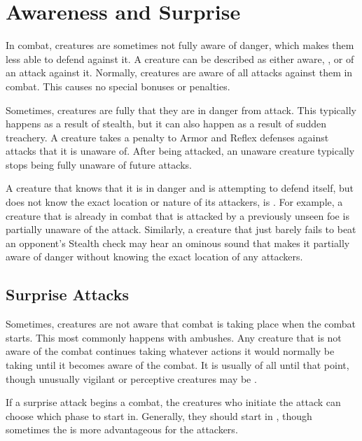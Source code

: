 \section{Awareness and Surprise}\label{Awareness and Surprise}
  In combat, creatures are sometimes not fully aware of danger, which makes them less able to defend against it.
  A creature can be described as either aware, \unaware, or \partiallyunaware of an attack against it.
  Normally, creatures are aware of all attacks against them in combat.
  This causes no special bonuses or penalties.

  Sometimes, creatures are fully \unaware that they are in danger from attack.
  This typically happens as a result of stealth, but it can also happen as a result of sudden treachery.
  A creature takes a  penalty to Armor and Reflex defenses against attacks that it is unaware of.
  After being attacked, an unaware creature typically stops being fully unaware of future attacks.

  A creature that knows that it is in danger and is attempting to defend itself, but does not know the exact location or nature of its attackers, is \partiallyunaware.
  For example, a creature that is already in combat that is attacked by a previously unseen foe is partially unaware of the attack.
  Similarly, a creature that just barely fails to beat an opponent's Stealth check may hear an ominous sound that makes it partially aware of danger without knowing the exact location of any attackers.

  \subsection{Surprise Attacks}\label{Surprise Attacks}
    Sometimes, creatures are not aware that combat is taking place when the combat starts.
    This most commonly happens with ambushes.
    Any creature that is not aware of the combat continues taking whatever actions it would normally be taking until it becomes aware of the combat.
    It is usually \unaware of all until that point, though unusually vigilant or perceptive creatures may be \partiallyunaware.

    If a surprise attack begins a combat, the creatures who initiate the attack can choose which phase to start in.
    Generally, they should start in , though sometimes the  is more advantageous for the attackers.

